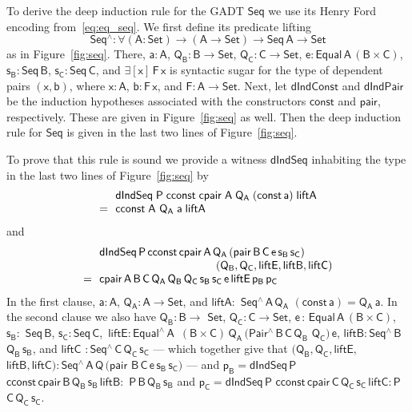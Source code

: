 \documentclass[sigplan,10pt]{acmart}
\begin{document}
To derive the deep induction rule for the GADT $\mathsf{Seq}$ we use
its Henry Ford encoding from~\eqref{eq:eq_seq}.  We first define its
predicate lifting
\[\mathsf{Seq^\wedge : \forall (A : Set) \to (A \to
  Set) \to Seq\,A \to Set}\] as in Figure~\ref{fig:seq}. There,
$\mathsf{a : A}$, $\mathsf{Q_B : B \to Set}$, $\mathsf{Q_C : C \to
  Set}$, $\mathsf{e : Equal\,A\,(B \times C)}$, $\mathsf{s_B :
  Seq\,B}$, $\mathsf{s_C : Seq\,C}$, and $\mathsf{\exists [x]\, F
  \,x}$ is syntactic sugar for the type of dependent pairs
$\mathsf{(x,b)}$, where $\mathsf{x : A}$, $\mathsf{b : F\, x}$, and
$\mathsf{F : A \to Set}$. Next, let $\mathsf{dIndConst}$ and
$\mathsf{dIndPair}$ be the induction hypotheses associated with the
constructors $\mathsf{const}$ and $\mathsf{pair}$, respectively. These
are given in Figure~\ref{fig:seq} as well. Then the deep induction
rule for $\mathsf{Seq}$ is given in the last two lines of
Figure~\ref{fig:seq}.

To prove that this rule is sound we provide a witness
$\mathsf{dIndSeq}$ inhabiting the type in the last two lines of
Figure~\ref{fig:seq} by
\[\begin{array}{ll}
& \!\!\mathsf{dIndSeq\;P\;cconst\;cpair\;A\;Q_A\;(const\,a)\;liftA}\\
= & \!\!\mathsf{cconst\;A}$ $\mathsf{Q_A\;a\;liftA}
\end{array}\]
and
\[\begin{array}{ll}
 &\!\!\mathsf{dIndSeq\,P\,cconst\,cpair\,A\,Q_A\,(pair\,B\,C\,e\,s_B\,s_C)}\\
 & \hspace*{1.4in}\mathsf{(Q_B, Q_C, liftE, liftB, liftC)}\\
= &\!\! \mathsf{cpair\,A\,B\,C\,Q_A\,Q_B\,Q_C\,s_B\,s_C\,e\,liftE\,
  p_B\,p_C}
\end{array}\]
In the first clause, $\mathsf{a : A}$, $\mathsf{Q_A : A
  \to Set}$, and $\mathsf{liftA :}$
$\mathsf{Seq^{\wedge}\,A\,Q_A}$ $\mathsf{(const\,a) = Q_A\,a}$. In the second
clause we also have $\mathsf{Q_B : B \to}$ $\mathsf{Set}$, $\mathsf{Q_C : C \to
  Set}$, $\mathsf{e \,:\, Equal\,A\,(B \times C)}$,\, $\mathsf{s_B :}$
$\mathsf{Seq\,B}$, $\mathsf{s_C : Seq\,C}$,\, $\mathsf{liftE :
  Equal^{\wedge}\,A\,}$ $\mathsf{(B \times C)\, Q_A\, (Pair^\wedge
  \,B\,C\,Q_B}$ $\mathsf{Q_C) \, e}$, $\mathsf{liftB :
  Seq^{\wedge}\,B}$ $\mathsf{Q_B\,s_B}$, and $\mathsf{liftC}$ $\mathsf{ :
  Seq^{\wedge}\,C\,Q_C\,s_C}$ --- which together give that
$\mathsf{(Q_B, Q_C, liftE,}$ $\mathsf{liftB, liftC) :
  Seq^{\wedge}\,A\,Q\,(pair}$ $\mathsf{B\,C\,e\,s_B\,s_C)}$ --- and
$\mathsf{p_B} = \mathsf{dIndSeq\,P}$
$\mathsf{cconst\,cpair\,B\,Q_B\,s_B\,liftB :}$
$\mathsf{P\,B\,Q_B\,s_B}$ and $\mathsf{p_C} =\mathsf{dIndSeq\,P}$
$\mathsf{cconst\,cpair\,C\,Q_C\,s_C\,liftC : P}$
$\mathsf{C\,Q_C\,s_C}$.
\end{document}
